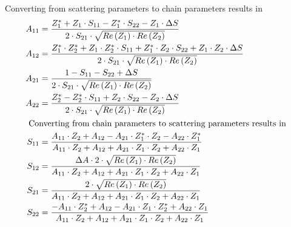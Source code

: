 \addvspace{12pt}

Converting from scattering parameters to chain parameters results in
\begin{align}
A_{11} &= \dfrac{Z_{1}^{*} + Z_{1}\cdot S_{11} - Z_{1}^{*}\cdot S_{22} - Z_{1}\cdot \Delta S}{2\cdot S_{21}\cdot \sqrt{Re\left(Z_{1}\right)\cdot Re\left(Z_{2}\right)}}\\
A_{12} &= \dfrac{Z_{1}^{*}\cdot Z_{2}^{*} + Z_{1}\cdot Z_{2}^{*}\cdot S_{11} + Z_{1}^{*}\cdot Z_{2}\cdot S_{22} + Z_{1}\cdot Z_{2}\cdot \Delta S}{2\cdot S_{21}\cdot \sqrt{Re\left(Z_{1}\right)\cdot Re\left(Z_{2}\right)}}\\
A_{21} &= \dfrac{1 - S_{11} - S_{22} + \Delta S}{2\cdot S_{21}\cdot \sqrt{Re\left(Z_{1}\right)\cdot Re\left(Z_{2}\right)}}\\
A_{22} &= \dfrac{Z_{2}^{*} - Z_{2}^{*}\cdot S_{11} + Z_{2}\cdot S_{22} - Z_{2}\cdot \Delta S}{2\cdot S_{21}\cdot \sqrt{Re\left(Z_{1}\right)\cdot Re\left(Z_{2}\right)}}\\
\intertext{
Converting from chain parameters to scattering parameters results in
}
S_{11} &= \dfrac{A_{11}\cdot Z_{2} + A_{12} - A_{21}\cdot Z_{1}^{*}\cdot Z_{2} - A_{22}\cdot Z_{1}^{*}}{A_{11}\cdot Z_{2} + A_{12} + A_{21}\cdot Z_{1}\cdot Z_{2} + A_{22}\cdot Z_{1}}\\
S_{12} &= \dfrac{\Delta A\cdot 2\cdot \sqrt{Re\left(Z_{1}\right)\cdot Re\left(Z_{2}\right)}}{A_{11}\cdot Z_{2} + A_{12} + A_{21}\cdot Z_{1}\cdot Z_{2} + A_{22}\cdot Z_{1}}\\
S_{21} &= \dfrac{2\cdot \sqrt{Re\left(Z_{1}\right)\cdot Re\left(Z_{2}\right)}}{A_{11}\cdot Z_{2} + A_{12} + A_{21}\cdot Z_{1}\cdot Z_{2} + A_{22}\cdot Z_{1}}\\
S_{22} &= \dfrac{-A_{11}\cdot Z_{2}^{*} + A_{12} - A_{21}\cdot Z_{1}\cdot Z_{2}^{*} + A_{22}\cdot Z_{1}}{A_{11}\cdot Z_{2} + A_{12} + A_{21}\cdot Z_{1}\cdot Z_{2} + A_{22}\cdot Z_{1}}
\end{align}

